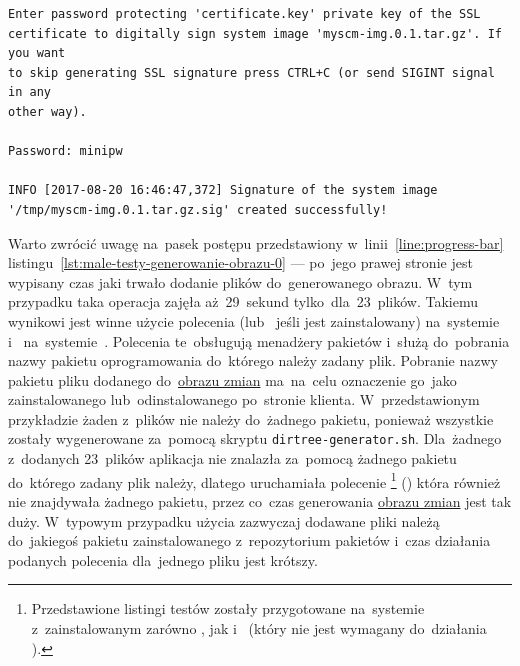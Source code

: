 \documentclass[thesis]{subfiles}
\begin{document}
\begin{minipage}{\linewidth}
\begin{lstlisting}
Enter password protecting 'certificate.key' private key of the SSL
certificate to digitally sign system image 'myscm-img.0.1.tar.gz'. If you want
to skip generating SSL signature press CTRL+C (or send SIGINT signal in any
other way).

Password: minipw

INFO [2017-08-20 16:46:47,372] Signature of the system image '/tmp/myscm-img.0.1.tar.gz.sig' created successfully!
\end{lstlisting}
\end{minipage}

Warto zwrócić uwagę na~pasek postępu przedstawiony w~linii~\ref{line:progress-bar} listingu~\ref{lst:male-testy-generowanie-obrazu-0} --- po~jego prawej stronie jest wypisany czas jaki trwało dodanie plików do~generowanego obrazu. W~tym przypadku taka operacja zajęła aż~29~sekund tylko~dla~23~plików. Takiemu wynikowi jest winne użycie polecenia  (lub~ jeśli jest zainstalowany) na~systemie \debian{} i~ na~systemie~\linuxarch{}. Polecenia te~obsługują menadżery pakietów i~służą do~pobrania nazwy pakietu oprogramowania do~którego należy zadany plik. Pobranie nazwy pakietu pliku dodanego do~\hyperref[sec:obraz-zmian-konfiguracji]{obrazu zmian} ma~na~celu oznaczenie go~jako zainstalowanego lub~odinstalowanego po~stronie klienta. W~przedstawionym przykładzie żaden z~plików nie należy do~żadnego pakietu, ponieważ wszystkie zostały wygenerowane za~pomocą skryptu \texttt{dirtree-generator.sh}. Dla~żadnego z~dodanych 23~plików aplikacja nie znalazła za~pomocą  żadnego pakietu do~którego zadany plik należy, dlatego uruchamiała polecenie \footnote{Przedstawione listingi testów zostały przygotowane na~systemie \debian{} z~zainstalowanym zarówno , jak i~ (który nie jest wymagany do~działania \texttt{\srvappname{}}).} () która również nie znajdywała żadnego pakietu, przez co~czas generowania \hyperref[sec:obraz-zmian-konfiguracji]{obrazu zmian} jest tak duży. W~typowym przypadku użycia \texttt{\srvappname{}} zazwyczaj dodawane pliki należą do~jakiegoś pakietu zainstalowanego z~repozytorium pakietów i~czas działania podanych polecenia dla~jednego pliku jest krótszy.
\end{document}
